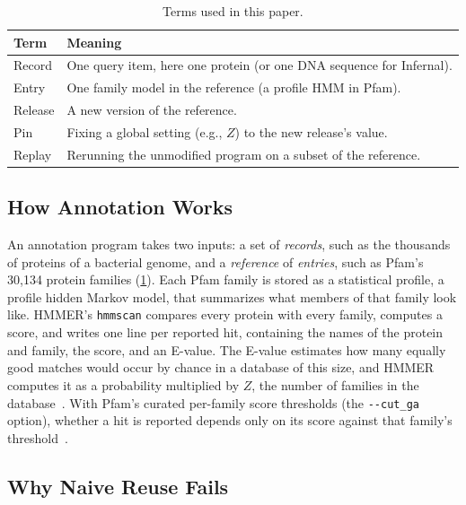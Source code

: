 \documentclass[letterpaper,twocolumn,10pt]{article}
\theoremstyle{definition}
\newcommand{\cutga}{\texttt{-{}-cut\_ga}\xspace}
\begin{document}
\begin{table}[t]
\caption{Terms used in this paper.}
\label{tab:glossary}
\centering\footnotesize
\setlength{\tabcolsep}{3pt}
\begin{tabular}{@{}>{\raggedright\arraybackslash}p{1.6cm}>{\raggedright\arraybackslash}p{6.2cm}@{}}
\toprule
Term & Meaning \\
\midrule
Record & One query item, here one protein (or one DNA sequence for Infernal). \\
Entry & One family model in the reference (a profile HMM in Pfam). \\
Release & A new version of the reference. \\
Pin & Fixing a global setting (e.g., $Z$) to the new release's value. \\
Replay & Rerunning the unmodified program on a subset of the reference. \\
\bottomrule
\end{tabular}
\end{table}

\subsection{How Annotation Works}

An annotation program takes two inputs: a set of \textit{records}, such as the thousands of proteins of a bacterial
genome, and a \textit{reference} of \textit{entries}, such as Pfam's 30{,}134 protein families (\cref{tab:glossary}).
Each Pfam family is stored as a statistical profile, a profile hidden Markov model, that summarizes what members
of that family look like. HMMER's \texttt{hmmscan} compares every protein with every family, computes a score, and
writes one line per reported hit, containing the names of the protein and family, the score, and an E-value. The
E-value estimates how many equally good matches would occur by chance in a database of this size, and HMMER computes
it as a probability multiplied by $Z$, the number of families in the database~\cite{eddy2011hmmer}. With Pfam's curated
per\nobreakdash-family score thresholds (the \cutga option), whether a hit is reported depends only on its score against that
family's threshold~\cite{pfam2025}.

\subsection{Why Naive Reuse Fails}
\end{document}
